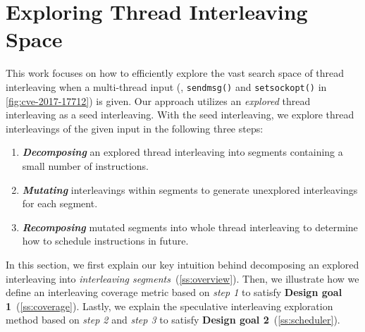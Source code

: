 \section{Exploring Thread Interleaving Space}
\label{s:design}





%

This work focuses on how to efficiently explore the vast search space
of thread interleaving when a multi-thread input (\eg,
\texttt{sendmsg()} and \texttt{setsockopt()} in
\autoref{fig:cve-2017-17712}) is given. Our approach utilizes an
\textit{explored} thread interleaving as a seed interleaving.
%
With the seed interleaving, we explore thread interleavings of the
given input in the following three steps:
%
\begin{enumerate}[labelsep=0pt, label=\textbf{\arabic*) }]
\item \textbf{\textit{Decomposing}} an explored thread interleaving
  into segments containing a small number of instructions.
\item \textbf{\textit{Mutating}} interleavings within segments to
  generate unexplored interleavings for each segment.
\item \textbf{\textit{Recomposing}} mutated segments into whole thread
  interleaving to determine how to schedule instructions in future.
\end{enumerate}
%


In this section, we first explain our key intuition behind decomposing
an explored interleaving into \textit{interleaving
  segments}~(\autoref{ss:overview}).
%
Then, we illustrate how we define an interleaving coverage metric
based on \textit{step 1} to satisfy \textbf{Design goal
  1}~(\autoref{ss:coverage}).
%
%
Lastly, we explain the speculative interleaving exploration method
based on \textit{step 2} and \textit{step 3} to satisfy \textbf{Design
  goal 2}~(\autoref{ss:scheduler}).




